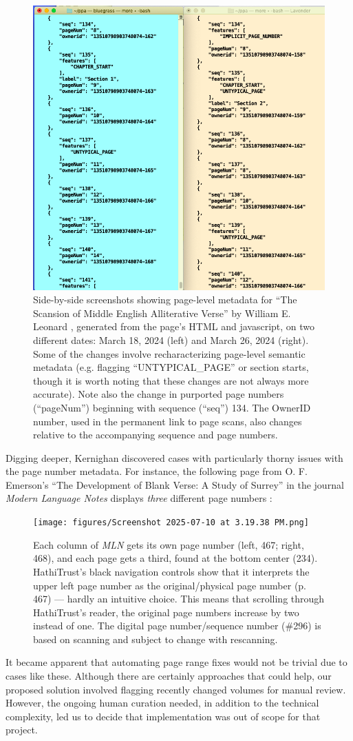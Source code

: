\documentclass{anthology-ch}         %
\begin{document}
\begin{figure}
    \centering
    \includegraphics[width=0.5\linewidth]{figures/y.png}
    \caption{Side-by-side screenshots showing page-level metadata for “The Scansion of Middle English Alliterative Verse” by William E. Leonard \cite{noauthor_scansion_nodate}, generated from the page’s HTML and javascript, on two different dates: March 18, 2024 (left) and March 26, 2024 (right). Some of the changes involve recharacterizing page-level semantic metadata (e.g. flagging “UNTYPICAL\_PAGE” or section starts, though it is worth noting that these changes are not always more accurate). Note also the change in purported page numbers (“pageNum”) beginning with sequence (“seq”) 134. The OwnerID number, used in the permanent link to page scans, also changes relative to the accompanying sequence and page numbers.}
    \label{fig:code-comparison}
\end{figure}
Digging deeper, Kernighan discovered cases with particularly thorny issues with the page number metadata. For instance, the following page from O. F. Emerson’s “The Development of Blank Verse: A Study of Surrey” in the journal \textit{Modern Language Notes }displays \textit{three} different page numbers \cite{emerson_o_f_development_1889}:

\begin{figure}
    \centering
    \texttt{[image: figures/Screenshot 2025-07-10 at 3.19.38 PM.png]}
    \caption{Each column of \textit{MLN }gets its own page number (left, 467; right, 468), and each page gets a third, found at the bottom center (234). HathiTrust’s black navigation controls show that it interprets the upper left page number as the original/physical page number (p. 467) — hardly an intuitive choice. This means that scrolling through HathiTrust’s reader, the original page numbers increase by two instead of one. The digital page number/sequence number (\#296) is based on scanning and subject to change with rescanning.}
    \label{fig:MLN}
\end{figure}
It became apparent that automating page range fixes would not be trivial due to cases like these. Although there are certainly approaches that could help, our proposed solution involved flagging recently changed volumes for manual review. However, the ongoing human curation needed, in addition to the technical complexity, led us to decide that implementation was out of scope for that project.
\end{document}
